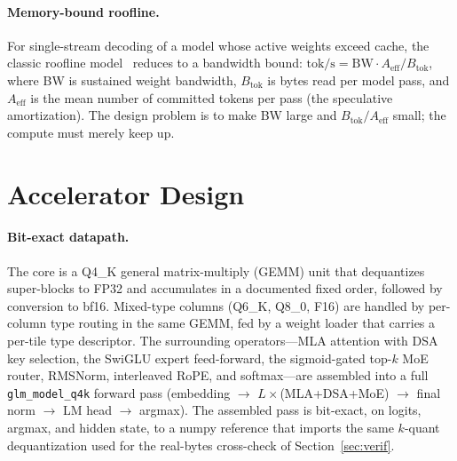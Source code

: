 \documentclass[11pt]{article}
\newcommand{\code}[1]{\texttt{#1}}
\newcommand{\tps}{tok/s}
\begin{document}
\paragraph{Memory-bound roofline.} For single-stream decoding of a model whose
active weights exceed cache, the classic roofline model~\cite{roofline} reduces
to a bandwidth bound:
$\text{\tps} = \text{BW} \cdot A_{\mathrm{eff}} / B_{\text{tok}}$,
where BW is sustained weight bandwidth, $B_{\text{tok}}$ is bytes read per
model pass, and $A_{\mathrm{eff}}$ is the mean number of committed tokens per
pass (the speculative amortization). The design problem is to make BW large and
$B_{\text{tok}}/A_{\mathrm{eff}}$ small; the compute must merely keep up.

\section{Accelerator Design}
\label{sec:design}

\paragraph{Bit-exact datapath.} The core is a Q4\_K general matrix-multiply
(GEMM) unit that dequantizes super-blocks to FP32 and accumulates in a
documented fixed order, followed by conversion to bf16. Mixed-type columns
(Q6\_K, Q8\_0, F16) are handled by per-column type routing in the same GEMM,
fed by a weight loader that carries a per-tile type descriptor. The surrounding
operators---MLA attention with DSA key selection, the SwiGLU expert
feed-forward, the sigmoid-gated top-$k$ MoE router, RMSNorm, interleaved RoPE,
and softmax---are assembled into a full \code{glm\_model\_q4k} forward pass
(embedding $\rightarrow$ $L\times$(MLA{+}DSA{+}MoE) $\rightarrow$ final norm
$\rightarrow$ LM head $\rightarrow$ argmax). The assembled pass is bit-exact,
on logits, argmax, and hidden state, to a numpy reference that imports the same
$k$-quant dequantization used for the real-bytes cross-check of
Section~\ref{sec:verif}.
\end{document}

